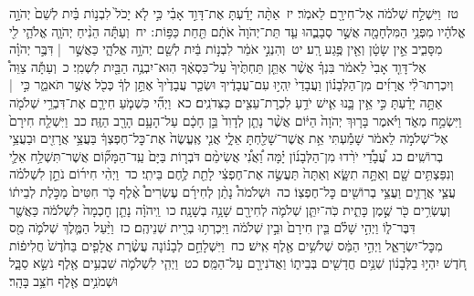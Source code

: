 \documentclass[18pt]{article}
\newcommand{\kri}[1]{\Afootnote{#1}}	%
\begin{document}
 {\loc טז~}וַיִּשְׁלַ֣ח שְׁלֹמֹ֔ה אֶל־חִירָ֖ם לֵאמֹֽר׃ \startlock
 {\loc יז~}אַתָּ֨ה יָדַ֜עְתָּ אֶת־דָּוִ֣ד אָבִ֗י כִּ֣י לֹ֤א יָכֹל֙ לִבְנ֣וֹת בַּ֗יִת לְשֵׁם֙ יְהֹוָ֣ה אֱלֹהָ֔יו מִפְּנֵ֥י הַמִּלְחָמָ֖ה אֲשֶׁ֣ר סְבָבֻ֑הוּ עַ֤ד תֵּת־יְהֹוָה֙ אֹתָ֔ם תַּ֖חַת כַּפּ֥וֹת  \edtext{(רגלו)}{\kri{קרי: רַגְלָֽי}} ׃ \startlock
 {\loc יח~}וְעַתָּ֕ה הֵנִ֨יחַ יְהֹוָ֧ה אֱלֹהַ֛י לִ֖י מִסָּבִ֑יב אֵ֣ין שָׂטָ֔ן וְאֵ֖ין פֶּ֥גַע רָֽע׃ \startlock
 {\loc יט~}וְהִנְנִ֣י אֹמֵ֔ר לִבְנ֣וֹת בַּ֔יִת לְשֵׁ֖ם יְהֹוָ֣ה אֱלֹהָ֑י כַּאֲשֶׁ֣ר  |  דִּבֶּ֣ר יְהֹוָ֗ה אֶל־דָּוִ֤ד אָבִי֙ לֵאמֹ֔ר בִּנְךָ֗ אֲשֶׁ֨ר אֶתֵּ֤ן תַּחְתֶּ֙יךָ֙ עַל־כִּסְאֶ֔ךָ הֽוּא־יִבְנֶ֥ה הַבַּ֖יִת לִשְׁמִֽי׃ \startlock
 {\loc כ~}וְעַתָּ֡ה צַוֵּה֩ וְיִכְרְתוּ־לִ֨י אֲרָזִ֜ים מִן־הַלְּבָנ֗וֹן וַעֲבָדַי֙ יִֽהְי֣וּ עִם־עֲבָדֶ֔יךָ וּשְׂכַ֤ר עֲבָדֶ֙יךָ֙ אֶתֵּ֣ן לְךָ֔ כְּכֹ֖ל אֲשֶׁ֣ר תֹּאמֵ֑ר כִּ֣י  |  אַתָּ֣ה יָדַ֗עְתָּ כִּ֣י אֵ֥ין בָּ֛נוּ אִ֛ישׁ יֹדֵ֥עַ לִכְרׇת־עֵצִ֖ים כַּצִּדֹנִֽים׃ \startlock
 {\loc כא~}וַיְהִ֞י כִּשְׁמֹ֧עַ חִירָ֛ם אֶת־דִּבְרֵ֥י שְׁלֹמֹ֖ה וַיִּשְׂמַ֣ח מְאֹ֑ד וַיֹּ֗אמֶר בָּר֤וּךְ יְהֹוָה֙ הַיּ֔וֹם אֲשֶׁ֨ר נָתַ֤ן לְדָוִד֙ בֵּ֣ן חָכָ֔ם עַל־הָעָ֥ם הָרָ֖ב הַזֶּֽה׃ \startlock
 {\loc כב~}וַיִּשְׁלַ֤ח חִירָם֙ אֶל־שְׁלֹמֹ֣ה לֵאמֹ֔ר שָׁמַ֕עְתִּי אֵ֥ת אֲשֶׁר־שָׁלַ֖חְתָּ אֵלָ֑י אֲנִ֤י אֶֽעֱשֶׂה֙ אֶת־כׇּל־חֶפְצְךָ֔ בַּעֲצֵ֥י אֲרָזִ֖ים וּבַעֲצֵ֥י בְרוֹשִֽׁים׃ \startlock
 {\loc כג~}עֲ֠בָדַ֠י יֹרִ֨דוּ מִן־הַלְּבָנ֜וֹן יָ֗מָּה וַ֠אֲנִ֠י אֲשִׂימֵ֨ם דֹּבְר֤וֹת בַּיָּם֙ עַֽד־הַמָּק֞וֹם אֲשֶׁר־תִּשְׁלַ֥ח אֵלַ֛י וְנִפַּצְתִּ֥ים שָׁ֖ם וְאַתָּ֣ה תִשָּׂ֑א וְאַתָּה֙ תַּעֲשֶׂ֣ה אֶת־חֶפְצִ֔י לָתֵ֖ת לֶ֥חֶם בֵּיתִֽי׃ \startlock
 {\loc כד~}וַיְהִ֨י חִיר֜וֹם נֹתֵ֣ן לִשְׁלֹמֹ֗ה עֲצֵ֧י אֲרָזִ֛ים וַעֲצֵ֥י בְרוֹשִׁ֖ים כׇּל־חֶפְצֽוֹ׃ \startlock
 {\loc כה~}וּשְׁלֹמֹה֩ נָתַ֨ן לְחִירָ֜ם עֶשְׂרִים֩ אֶ֨לֶף כֹּ֤ר חִטִּים֙ מַכֹּ֣לֶת לְבֵית֔וֹ וְעֶשְׂרִ֥ים כֹּ֖ר שֶׁ֣מֶן כָּתִ֑ית כֹּֽה־יִתֵּ֧ן שְׁלֹמֹ֛ה לְחִירָ֖ם שָׁנָ֥ה בְשָׁנָֽה׃ \startlock
 {\loc כו~}וַֽיהֹוָ֗ה נָתַ֤ן חׇכְמָה֙ לִשְׁלֹמֹ֔ה כַּאֲשֶׁ֖ר דִּבֶּר־ל֑וֹ וַיְהִ֣י שָׁלֹ֗ם בֵּ֤ין חִירָם֙ וּבֵ֣ין שְׁלֹמֹ֔ה וַיִּכְרְת֥וּ בְרִ֖ית שְׁנֵיהֶֽם׃ \startlock
 {\loc כז~}וַיַּ֨עַל הַמֶּ֧לֶךְ שְׁלֹמֹ֛ה מַ֖ס מִכׇּל־יִשְׂרָאֵ֑ל וַיְהִ֣י הַמַּ֔ס שְׁלֹשִׁ֥ים אֶ֖לֶף אִֽישׁ׃ \startlock
 {\loc כח~}וַיִּשְׁלָחֵ֣ם לְבָנ֗וֹנָה עֲשֶׂ֨רֶת אֲלָפִ֤ים בַּחֹ֙דֶשׁ֙ חֲלִיפ֔וֹת חֹ֚דֶשׁ יִהְי֣וּ בַלְּבָנ֔וֹן שְׁנַ֥יִם חֳדָשִׁ֖ים בְּבֵית֑וֹ וַאֲדֹנִירָ֖ם עַל־הַמַּֽס׃ \startlock
 {\loc כט~}וַיְהִ֧י לִשְׁלֹמֹ֛ה שִׁבְעִ֥ים אֶ֖לֶף נֹשֵׂ֣א סַבָּ֑ל וּשְׁמֹנִ֥ים אֶ֖לֶף חֹצֵ֥ב בָּהָֽר׃ \startlock
\end{document}
